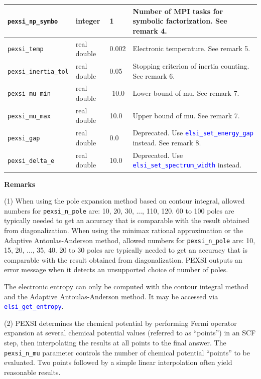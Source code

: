 \documentclass{report}
\newcommand{\api}[1]{\textcolor{blue}{\texttt{#1}}}
\begin{document}
\begin{tabular}[]{|p{30mm}|p{20mm}|p{15mm}|p{97mm}|}
\hline
\texttt{pexsi\_np\_symbo}     & integer     & 1     & Number of MPI tasks for symbolic factorization. See remark 4.\\
\hline
\texttt{pexsi\_temp}          & real double & 0.002 & Electronic temperature. See remark 5.\\
\hline
\texttt{pexsi\_inertia\_tol}  & real double & 0.05  & Stopping criterion of inertia counting. See remark 6.\\
\hline
\texttt{pexsi\_mu\_min}       & real double & -10.0 & Lower bound of mu. See remark 7.\\
\hline
\texttt{pexsi\_mu\_max}       & real double & 10.0  & Upper bound of mu. See remark 7.\\
\hline
\texttt{pexsi\_gap}           & real double & 0.0   & Deprecated. Use \api{elsi\_set\_energy\_gap} instead. See remark 8.\\
\hline
\texttt{pexsi\_delta\_e}      & real double & 10.0  & Deprecated. Use \api{elsi\_set\_spectrum\_width} instead.\\
\hline
\end{tabular}

\textbf{Remarks}

(1) When using the pole expansion method based on contour integral, allowed numbers for \texttt{pexsi\_n\_pole} are: 10, 20, 30, ..., 110, 120. 60 to 100 poles are typically needed to get an accuracy that is comparable with the result obtained from diagonalization. When using the minimax rational approximation or the Adaptive Antoulas-Anderson method, allowed numbers for \texttt{pexsi\_n\_pole} are: 10, 15, 20, ..., 35, 40. 20 to 30 poles are typically needed to get an accuracy that is comparable with the result obtained from diagonalization. PEXSI outputs an error message when it detects an unsupported choice of number of poles.

The electronic entropy can only be computed with the contour integral method and the Adaptive Antoulas-Anderson method. It may be accessed via \api{elsi\_get\_entropy}.

(2) PEXSI determines the chemical potential by performing Fermi operator expansion at several chemical potential values (referred to as ``points'') in an SCF step, then interpolating the results at all points to the final answer. The \texttt{pexsi\_n\_mu} parameter controls the number of chemical potential ``points'' to be evaluated. Two points followed by a simple linear interpolation often yield reasonable results.
\end{document}
